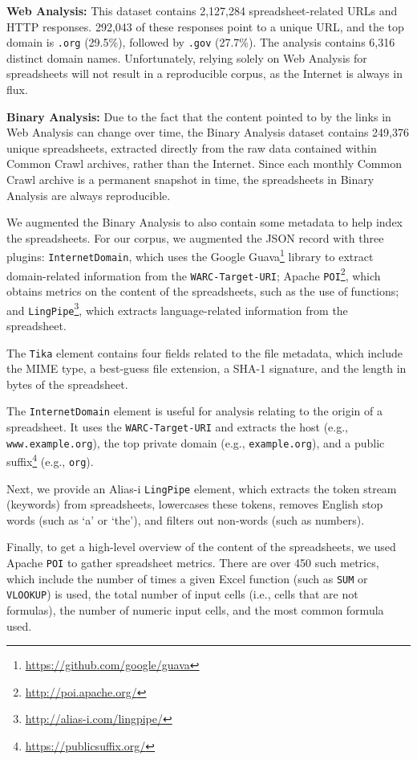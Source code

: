 \documentclass[conference]{IEEEtran}
\newcommand{\urlcount}{2,127,284}
\newcommand{\xlscount}{249,376}
\begin{document}
\textbf{Web Analysis:} This dataset contains \urlcount{} spreadsheet-related URLs and HTTP responses. 292,043 of these responses point to a unique URL, and the top domain is \texttt{.org} (29.5\%), followed by \texttt{.gov} (27.7\%). 
The analysis contains 6,316 distinct domain names. Unfortunately, relying solely on Web Analysis for spreadsheets will not result in a reproducible corpus, as the Internet is always in flux.

\textbf{Binary Analysis:}  Due to the fact that the content pointed to by the links in Web Analysis can change over time, the Binary Analysis dataset contains \xlscount{} unique spreadsheets, extracted directly from the raw data contained within Common Crawl archives, rather than the Internet. 
Since each monthly Common Crawl archive is a permanent snapshot in time, the spreadsheets in Binary Analysis are always reproducible.

We augmented the Binary Analysis to also contain some metadata to help index the spreadsheets.
For our corpus, we augmented the JSON record with three plugins: 
\texttt{InternetDomain}, which uses the Google Guava\footnote{\url{https://github.com/google/guava}} library to extract domain-related information from the \texttt{WARC-Target-URI};
Apache \texttt{POI}\footnote{\url{http://poi.apache.org/}}, which obtains metrics on the content of the spreadsheets, such as the use of functions;
and \texttt{LingPipe}\footnote{\url{http://alias-i.com/lingpipe/}}, which extracts language-related information from the spreadsheet. 

The \texttt{Tika} element contains four fields related to the file metadata, which include the MIME type, a best-guess file extension, a SHA-1 signature, and the length in bytes of the spreadsheet.

The \texttt{InternetDomain} element is useful for analysis relating to the origin of a spreadsheet. It uses the \texttt{WARC-Target-URI} and extracts the host (e.g., \texttt{www.example.org}), the top private domain (e.g., \texttt{example.org}), and a public suffix\footnote{\url{https://publicsuffix.org/}} (e.g., \texttt{org}).

Next, we provide an Alias-i \texttt{LingPipe} element, which extracts the token stream (keywords) from spreadsheets, lowercases these tokens, removes English stop words (such as `a' or `the'), and filters out non-words (such as numbers).

Finally, to get a high-level overview of the content of the spreadsheets, we used Apache \texttt{POI} to gather spreadsheet metrics. There are over 450 such metrics, which include the number of times a given Excel function (such as \texttt{SUM} or \texttt{VLOOKUP}) is used, the total number of input cells (i.e., cells that are not formulas), the number of numeric input cells, and the most common formula used. 
\end{document}
